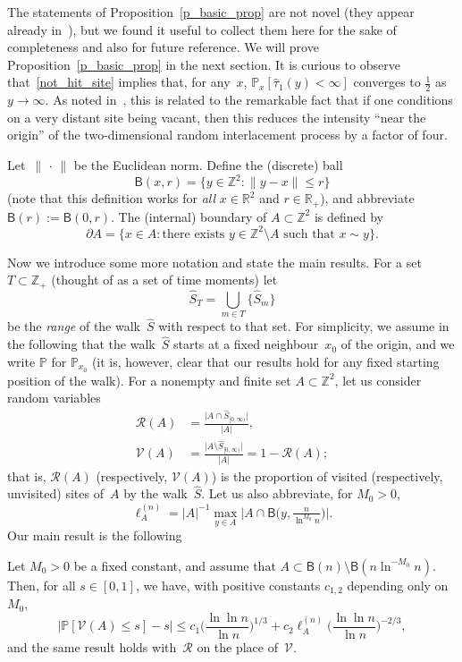 \documentclass[AHL,Unicode,longabstracts]{cedram}
\newcommand{\1}[1]{{\mathbf 1}{\{#1\}}}
\newcommand{\Z}{\mathbb{Z}}
\newcommand{\V}{{\mathcal V}}
\newcommand{\RR}{{\mathcal R}}
\newcommand{\R}{{\mathbb R}}
\newcommand{\s}{{\widehat S}}
\newcommand{\8}{{\infty}}
\newcommand{\IP}{{\mathbb P}}
\newcommand{\htau}{\widehat{\tau}}
\newcommand{\B}{{\mathsf B}}
\begin{document}
The statements of Proposition~\ref{p_basic_prop} are not novel (they appear already in~\cite{CPV16}), but we found it useful to collect them here for the sake of completeness and also for future reference. We will prove Proposition~\ref{p_basic_prop} in the next section. It is curious to observe that~\eqref{not_hit_site} implies that, for any~$x$, $\IP_x[\htau_1(y)<\infty]$ converges to $\frac{1}{2}$ as $y\to \infty$. As noted in~\cite{CPV16}, this is related to the remarkable fact that if one conditions on a very distant site being vacant, then this reduces the intensity ``near the origin'' of the two-dimensional random interlacement process by a factor of four.

Let~$\|{\,\cdot\,}\|$ be the Euclidean norm. Define the (discrete) ball
\[
\B(x,r) = \{y\in \Z^2: \|y-x\|\leq r\}
\]
(note that this definition works for \emph{all} $x\in\R^2$ and $r\in\R_+$), and abbreviate $\B(r):=\B(0,r)$. The (internal) boundary of $A\subset\Z^2$ is defined by
\[
\partial A = \{x\in A: \text{there exists }y\in \Z^2\setminus A
\text{ such that }x\sim y\}.
\]

Now we introduce some more notation and state the main results. For a set $T\subset\Z_+$ (thought of as a set of time moments) let
\[
\s_T=\bigcup_{m\in T}\big\{\s_m\big\}
\]
be the \emph{range} of the walk~$\s$ with respect to that set. For simplicity, we assume in the following that the walk~$\s$ starts at a fixed neighbour~$x_0$ of the origin, and we write $\IP$ for $\IP_{x_0}$ (it is, however, clear that our results hold for any fixed starting position of the walk). For a nonempty and finite set $A\subset \Z^2$, let us consider random variables
\begin{align*}
\RR(A) &= \frac{\big|A\cap \s_{[0,\infty)}\big|}{|A|},\\
\V(A) &= \frac{\big|A\setminus \s_{[0,\infty)}\big|}{|A|} = 1-\RR(A);
\end{align*}
that is, $\RR(A)$ (respectively, $\V(A)$) is the proportion of visited (respectively, unvisited) sites of~$A$ by the walk~$\s$. Let us also abbreviate, for $M_0 > 0$,
\begin{equation}\label{df_ell_A}
\ell^{(n)}_A= |A|^{-1}
\max_{y\in A}
\big|A\cap \B\big(y,{\tfrac{n}{\ln^{M_0}n}}\big)\big|.
\end{equation}
Our main result is the following
\begin{theo}\label{t_main_res}
Let $M_0>0$ be a fixed constant, and assume that $A\subset \B(n)\setminus \B(n\ln^{-M_0}n)$. Then, for all $s\in [0,1]$, we have, with positive constants $c_{1,2}$ depending only on~$M_0$,
\begin{equation}\label{main_res}
\big|\IP[\V(A)\leq s] - s\big|
\leq c_1\Big(\frac{\ln\ln n}{\ln n}\Big)^{1/3} + c_2\ell^{(n)}_A \Big(\frac{\ln\ln n}{\ln n}\Big)^{-2/3},
\end{equation}
and the same result holds with~$\RR$ on the place of~$\V$.
\end{theo}
\end{document}
